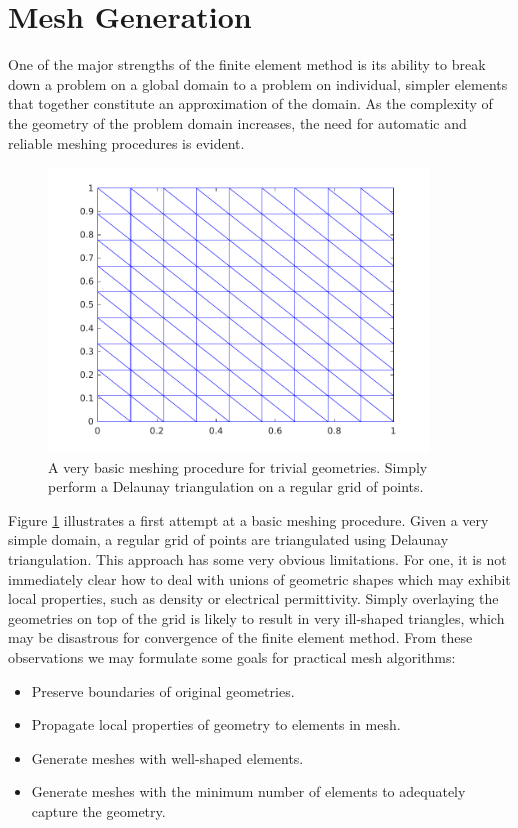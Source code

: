 \documentclass[10pt,a4paper]{article}
\begin{document}
\section*{Mesh Generation}
One of the major strengths of the finite element method is its ability to break down a problem on a global domain to a problem on individual, simpler elements that together constitute an approximation of the domain. As the complexity of the geometry of the problem domain increases, the need for automatic and reliable meshing procedures is evident. 

\begin{figure}[htb]
	\centering
    \includegraphics[width=0.9\textwidth]{figures/basic_rect_mesh}
    \caption{A very basic meshing procedure for trivial geometries. Simply perform a Delaunay triangulation on a regular grid of points.}
    \label{fig:basic_rect_mesh}
\end{figure}

Figure \ref{fig:basic_rect_mesh} illustrates a first attempt at a basic meshing procedure. Given a very simple domain, a regular grid of points are triangulated using Delaunay triangulation. This approach has some very obvious limitations. For one, it is not immediately clear how to deal with unions of geometric shapes which may exhibit local properties, such as density or electrical permittivity. Simply overlaying the geometries on top of the grid is likely to result in very ill-shaped triangles, which may be disastrous for convergence of the finite element method. From these observations we may formulate some goals for practical mesh algorithms:

\begin{itemize}
  \item Preserve boundaries of original geometries.
  \item Propagate local properties of geometry to elements in mesh.
  \item Generate meshes with well-shaped elements.
  \item Generate meshes with the minimum number of elements to adequately capture the geometry.
\end{itemize}
\end{document}
